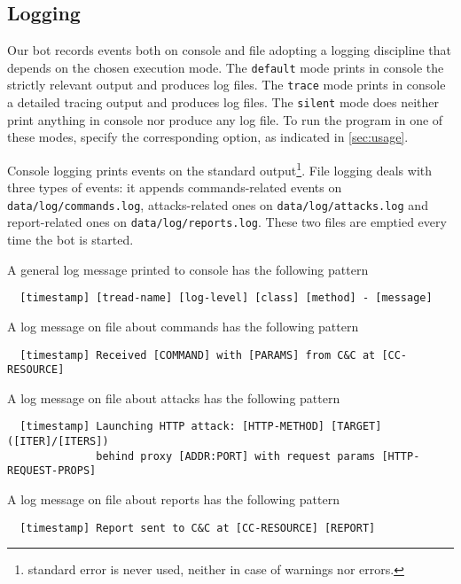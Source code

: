 \subsection{Logging}
\label{sec:logging}

Our bot records events both on console and file adopting a logging discipline that depends on the chosen execution mode. The \texttt{default} mode prints in console the strictly relevant output and produces log files. The \texttt{trace} mode prints in console a detailed tracing output and produces log files. The \texttt{silent} mode does neither print anything in console nor produce any log file.
To run the program in one of these modes, specify the corresponding option, as indicated in \ref{sec:usage}.

Console logging prints events on the standard output\footnote{standard error is never used, neither in case of warnings nor errors.}.
File logging deals with three types of events: it appends commands-related events on \texttt{data/log/commands.log}, attacks-related ones on \texttt{data/log/attacks.log} and report-related ones on \texttt{data/log/reports.log}. These two files are emptied every time the bot is started.

A general log message printed to console has the following pattern

\begin{verbatim}
  [timestamp] [tread-name] [log-level] [class] [method] - [message]
\end{verbatim}

A log message on file about commands has the following pattern

\begin{verbatim}
  [timestamp] Received [COMMAND] with [PARAMS] from C&C at [CC-RESOURCE]
\end{verbatim}

A log message on file about attacks has the following pattern

\begin{verbatim}
  [timestamp] Launching HTTP attack: [HTTP-METHOD] [TARGET] ([ITER]/[ITERS])
              behind proxy [ADDR:PORT] with request params [HTTP-REQUEST-PROPS]
\end{verbatim}

A log message on file about reports has the following pattern

\begin{verbatim}
  [timestamp] Report sent to C&C at [CC-RESOURCE] [REPORT]
\end{verbatim}
